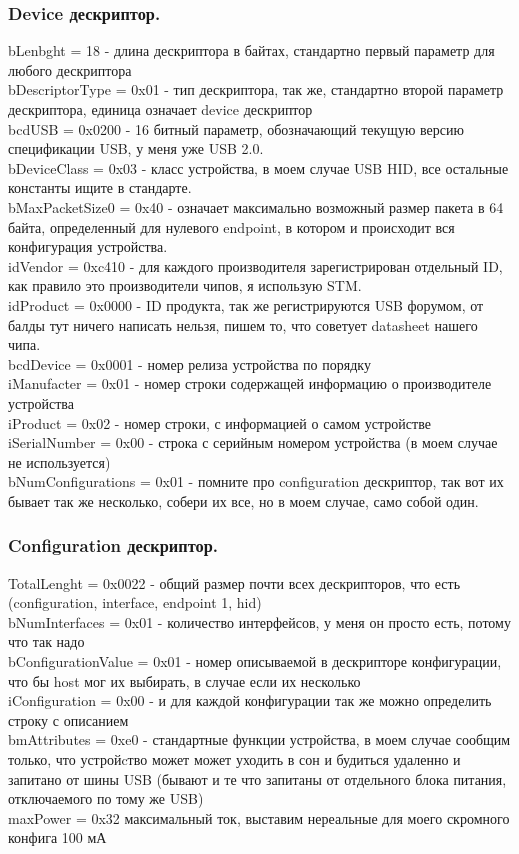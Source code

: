 \documentclass[12pt,a4paper]{article}
\begin{document}
\subsubsection{Device дескриптор.}
    bLenbght = 18 - длина дескриптора в байтах, стандартно первый параметр для
    любого дескриптора\\
    bDescriptorType = 0x01 - тип дескриптора, так же, стандартно второй
    параметр дескриптора, единица означает device дескриптор\\
    bcdUSB = 0x0200 - 16 битный параметр, обозначающий текущую версию
    спецификации USB, у меня уже USB 2.0.\\
    bDeviceClass = 0x03 - класс устройства, в моем случае USB HID, все
    остальные константы ищите в стандарте.\\
    bMaxPacketSize0 = 0x40 - означает максимально возможный размер пакета в 64
    байта, определенный для нулевого endpoint, в котором и происходит вся
    конфигурация устройства.\\
    idVendor = 0xc410 - для каждого производителя зарегистрирован отдельный ID,
    как правило это производители чипов, я использую STM.\\
    idProduct = 0x0000 - ID продукта, так же регистрируются USB форумом, от
    балды тут ничего написать нельзя, пишем то, что советует datasheet нашего
    чипа.\\
    bcdDevice = 0x0001 - номер релиза устройства по порядку\\
    iManufacter = 0x01 - номер строки содержащей информацию о производителе
    устройства\\
    iProduct = 0x02 - номер строки, с информацией о самом устройстве\\
    iSerialNumber = 0x00 - строка с серийным номером устройства (в моем случае
    не используется)\\
    bNumConfigurations = 0x01 - помните про configuration дескриптор, так вот
    их бывает так же несколько, собери их все, но в моем случае, само собой
    один.
\subsubsection{Configuration дескриптор.}
    TotalLenght = 0x0022 - общий размер почти всех дескрипторов, что есть
    (configuration, interface, endpoint 1, hid)\\
    bNumInterfaces = 0x01 - количество интерфейсов, у меня он просто есть,
    потому что так надо\\
    bConfigurationValue = 0x01 - номер описываемой в дескрипторе конфигурации,
    что бы host мог их выбирать, в случае если их несколько\\
    iConfiguration = 0x00 - и для каждой конфигурации так же можно определить
    строку с описанием\\
    bmAttributes = 0xe0 - стандартные функции устройства, в моем случае сообщим
    только, что устройcтво может может уходить в сон и будиться удаленно и
    запитано от шины USB (бывают и те что запитаны от отдельного блока питания,
    отключаемого по тому же USB)\\
    maxPower = 0x32 максимальный ток, выставим нереальные для моего скромного
    конфига 100 мА
\end{document}
